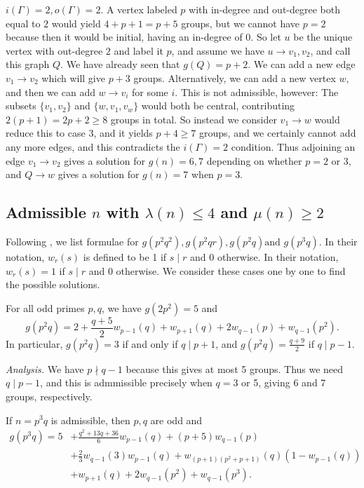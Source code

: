  $i(\Gamma) = 2, o(\Gamma) = 2$. A vertex labeled $p$ with in-degree and out-degree both equal to $2$ would yield $4 + p + 1 = p + 5$ groups, but we cannot have $p = 2$ because then it would be initial, having an in-degree of $0$. So let $u$ be the unique vertex with out-degree $2$ and label it $p$, and assume we have $u \rightarrow v_1, v_2$, and call this graph $Q$. We have already seen that $g(Q) = p + 2$.
We can add a new edge $v_1 \rightarrow v_2$ which will give $p + 3$ groups. Alternatively, we can add a new vertex $w$, and then we can add $w \rightarrow v_i$ for some $i$. This is not admissible, however: The subsets $\{v_1, v_2\}$ and $\{w, v_1, v_w\}$ would both be central, contributing $2(p + 1) = 2p + 2 \ge 8$ groups in total. So instead we consider $v_1 \rightarrow w$ would reduce this to case 3, and it yields $p + 4 \ge 7$ groups, and we certainly cannot add any more edges, and this contradicts the $i(\Gamma) = 2$ condition. Thus adjoining an edge $v_1 \rightarrow v_2$ gives a solution for $g(n) = 6, 7$ depending on whether $p = 2$ or $3$, and $Q \rightarrow w$ gives a solution for $g(n) = 7$ when $p = 3$. 

\subsection{Admissible $n$ with $\lambda(n) \le 4$ and $\mu(n) \ge 2$}
Following {\cite{bettinafour1}}, we list formulae for $g(p^2 q^2), g(p^2 q r), g(p^2 q) \text{and } g(p^3 q).$ In their notation, $w_r(s)$ is defined to be 1 if $s \mid r$ and 0 otherwise. In their notation, $w_r(s) = 1$ if $s \mid r$ and 0 otherwise. We consider these cases one by one to find the possible solutions.

\begin{fact}
	For all odd primes $p, q$, we have $g(2p^2) = 5$ and \[g(p^2 q) = 2 + \frac{q + 5}{2} w_{p - 1}(q) + w_{p + 1}(q) + 2w_{q - 1}(p) + w_{q - 1}(p^2).\] In particular, $g(p^2 q) = 3$ if and only if $q \mid p + 1$, and $g(p^2 q) = \frac{q + 9}{2}$ if $q \mid p - 1$.
\end{fact}

\textit{Analysis.} We have $p \nmid q - 1$ because this gives at most 5 groups. Thus we need $q \mid p - 1$, and this is admmissible precisely when $q = 3$ or 5, giving 6 and 7 groups, respectively.

\begin{fact}
	If $n = p^3 q$ is admissible, then $p, q$ are odd and
	$$\begin{aligned}
		g(p^3 q) = 5 &+ \frac{q^2 + 13q + 36}{6} w_{p - 1}(q) + (p + 5) w_{q - 1}(p) \\
		&+ \frac{2}{3} w_{q - 1}(3)w_{p - 1}(q) + w_{(p + 1)(p^2 + p + 1)}(q) (1 - w_{p - 1}(q)) \\
		&+ w_{p + 1}(q) + 2 w_{q - 1}(p^2) + w_{q - 1}(p^3).
	\end{aligned}$$
\end{fact}

